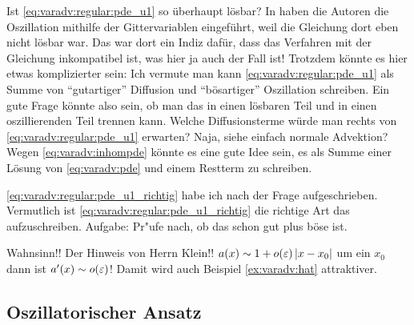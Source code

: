 \begin{frage}
Ist \eqref{eq:varadv:regular:pde_u1} so überhaupt lösbar?
In \cite{Junk2004} haben die Autoren die Oszillation mithilfe der Gittervariablen eingeführt, weil die Gleichung dort eben nicht lösbar war.
Das war dort ein Indiz dafür, dass das Verfahren mit der Gleichung inkompatibel ist, was hier ja auch der Fall ist!
Trotzdem könnte es hier etwas komplizierter sein: Ich vermute man kann \eqref{eq:varadv:regular:pde_u1} als Summe von ``gutartiger'' Diffusion und ``bösartiger'' Oszillation schreiben.
Ein gute Frage könnte also sein, ob man das in einen lösbaren Teil und in einen oszillierenden Teil trennen kann.
Welche Diffusionsterme würde man rechts von \eqref{eq:varadv:regular:pde_u1} erwarten? Naja, siehe einfach normale Advektion?
Wegen \eqref{eq:varadv:inhompde} könnte es eine gute Idee sein, es als Summe einer Lösung von \eqref{eq:varadv:pde} und einem Restterm zu schreiben.
\end{frage}

\begin{bemerkung}
\eqref{eq:varadv:regular:pde_u1_richtig} habe ich nach der Frage aufgeschrieben.
Vermutlich ist \eqref{eq:varadv:regular:pde_u1_richtig} die richtige Art das aufzuschreiben. Aufgabe: Pr"ufe nach, ob das schon gut plus böse ist.
\end{bemerkung}

\begin{bemerkung}
Wahnsinn!! Der Hinweis von Herrn Klein!! $a(x) \sim 1 + o(\varepsilon)\left| x-x_0 \right|$ um ein $x_0$ dann ist $a'(x) \sim o(\varepsilon)$!
Damit wird auch Beispiel \ref{ex:varadv:hat} attraktiver.
\end{bemerkung}


\subsection{Oszillatorischer Ansatz}

